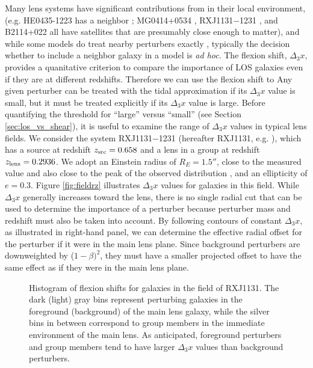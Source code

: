 \documentclass{emulateapj}
\begin{document}
Many lens systems have significant contributions from in their local environment, (e.g. HE0435-1223 has a neighbor \citealt{Kochanek06}; MG0414+0534 \citep{Tonry99}, RXJ1131$-$1231 \citep{Sluse03}, and B2114+022 \citep{King99} all have satellites that are presumably close enough to matter), and while some models do treat nearby perturbers exactly \citep[e.g.][]{Fadely12}, typically the decision whether to include a neighbor galaxy in a model is \textit{ad hoc}. The flexion shift, $\Delta_3 x$, provides a quanitative criterion to compare the importance of LOS galaxies even if they are at different redshifts. Therefore we can use the flexion shift to  Any given perturber can be treated with the tidal approximation if its $\Delta_3 x$ value is small, but it must be treated explicitly if its $\Delta_3 x$ value is large.  Before quantifying the threshold for ``large'' versus ``small'' (see Section \ref{sec:los_vs_shear}), it is useful to examine the range of $\Delta_3 x$ values in typical lens fields.  We consider the system RXJ1131$-$1231 (hereafter RXJ1131, e.g. \citealt{Suyu13}), which has a source at redshift $z_{\rm{src}} = 0.658$ and a lens in a group at redshift $z_{\rm{lens}} = 0.2936$.  We adopt an Einstein radius of $R_E = 1.5''$, close to the measured value \citep{Suyu13} and also close to the peak of the observed distribution \citep{Sonnenfeld13}, and an ellipticity of $e=0.3$.  Figure \ref{fig:fieldrz} illustrates $\Delta_3 x$ values for galaxies in this field.  While $\Delta_3 x$ generally increases toward the lens, there is no single radial cut that can be used to determine the importance of a perturber because perturber mass and redshift must also be taken into account.  By following contours of constant $\Delta_3 x$, as illustrated in right-hand panel, we can determine the effective radial offset for the perturber if it were in the main lens plane. Since background perturbers are downweighted by ($1-\beta)^2$, they must have a smaller projected offset to have the same effect as if they were in the main lens plane. 

\begin{figure}[t]
\begin{center}
\caption{\label{fig:d3xhist} Histogram of flexion shifts for galaxies in the field of RXJ1131.  The dark (light) gray bins represent perturbing galaxies in the foreground (background) of the main lens galaxy, while the silver bins in between correspond to group members in the immediate environment of the main lens. As anticipated, foreground perturbers and group members tend to have larger $\Delta_3 x$ values than background perturbers.%
}
\end{center}
\end{figure}
\end{document}
